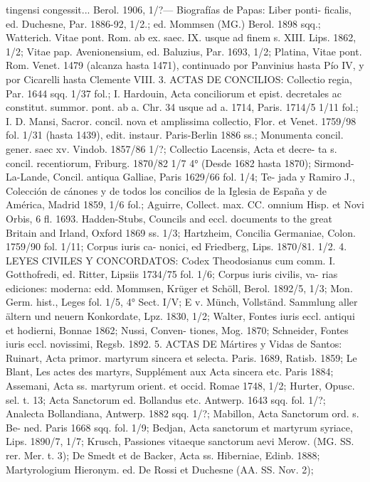\raggedbottom{} \documentclass[12pt, a4paper]{book}
\begin{document}
tingensi congessit... Berol. 1906, 1/?— Biografías de Papas: Liber ponti-
ficalis, ed. Duchesne, Par. 1886-92, 1/2.; ed. Mommsen (MG.) Berol. 1898
sqq.; Watterich. Vitae pont. Rom. ab ex. saec. IX. usque ad finem s. XIII.
Lips. 1862, 1/2; Vitae pap. Avenionensium, ed. Baluzius, Par. 1693, 1/2;
Platina, Vitae pont. Rom. Venet. 1479 (alcanza hasta 1471), continuado por
Panvinius hasta Pío IV, y por Cicarelli hasta Clemente VIII.
3. ACTAS DE CONCILIOS: Collectio regia, Par. 1644 sqq. 1/37 fol.;
I. Hardouin, Acta conciliorum et epist. decretales ac constitut. summor.
pont. ab a. Chr. 34 usque ad a. 1714, Paris. 1714/5 1/11 fol.; I. D. Mansi,
Sacror. concil. nova et amplissima collectio, Flor. et Venet. 1759/98 fol.
1/31 (hasta 1439), edit. instaur. Paris-Berlin 1886 ss.; Monumenta concil.
gener. saec xv. Vindob. 1857/86 1/?; Collectio Lacensis, Acta et decre-
ta s. concil. recentiorum, Friburg. 1870/82 1/7 4° (Desde 1682 hasta 1870);
Sirmond-La-Lande, Concil. antiqua Galliae, Paris 1629/66 fol. 1/4; Te-
jada y Ramiro J., Colección de cánones y de todos los concilios de la
Iglesia de España y de América, Madrid 1859, 1/6 fol.; Aguirre, Collect.
max. CC. omnium Hisp. et Novi Orbis, 6 fl. 1693. Hadden-Stubs, Councils
and eccl. documents to the great Britain and Irland, Oxford 1869 ss. 1/3;
Hartzheim, Concilia Germaniae, Colon. 1759/90 fol. 1/11; Corpus iuris ca-
nonici, ed Friedberg, Lips. 1870/81. 1/2.
4. LEYES CIVILES Y CONCORDATOS: Codex Theodosianus cum comm.
I. Gotthofredi, ed. Ritter, Lipsiis 1734/75 fol. 1/6; Corpus iuris civilis, va-
rias ediciones: moderna: edd. Mommsen, Krüger et Schöll, Berol.
1892/5, 1/3; Mon. Germ. hist., Leges fol. 1/5, 4° Sect. I/V; E v. Münch,
Vollständ. Sammlung aller ältern und neuern Konkordate, Lpz. 1830, 1/2;
Walter, Fontes iuris eccl. antiqui et hodierni, Bonnae 1862; Nussi, Conven-
tiones, Mog. 1870; Schneider, Fontes iuris eccl. novissimi, Regsb. 1892.
5. ACTAS DE Mártires y Vidas de Santos: Ruinart, Acta primor.
martyrum sincera et selecta. Paris. 1689, Ratisb. 1859; Le Blant, Les actes
des martyrs, Supplément aux Acta sincera etc. Paris 1884; Assemani, Acta
ss. martyrum orient. et occid. Romae 1748, 1/2; Hurter, Opusc. sel. t. 13;
Acta Sanctorum ed. Bollandus etc. Antwerp. 1643 sqq. fol. 1/?; Analecta
Bollandiana, Antwerp. 1882 sqq. 1/?; Mabillon, Acta Sanctorum ord. s. Be-
ned. Paris 1668 sqq. fol. 1/9; Bedjan, Acta sanctorum et martyrum syriace,
Lips. 1890/7, 1/7; Krusch, Passiones vitaeque sanctorum aevi Merow. (MG.
SS. rer. Mer. t. 3); De Smedt et de Backer, Acta ss. Hiberniae, Edinb.
1888; Martyrologium Hieronym. ed. De Rossi et Duchesne (AA. SS. Nov. 2);
\end{document}
